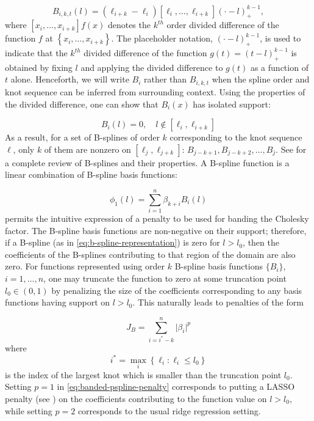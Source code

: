 \documentclass[12pt]{article}
\theoremstyle{definition}
\begin{document}
\begin{equation} \label{eq:bspline_definition}
B_{i,k,t}\left(l\right) = \left(\ell_{i+k}-\ell_i\right)\left[\ell_i,\dots,\ell_{i+k}\right]\left(\cdot -l \right)_+^{k-1},
\end{equation}  
\noindent
where $\left[ x_i,\dots,x_{i+k} \right] f\left(x\right)$ denotes the $k^{th}$ order divided difference of the function $f$ at $\left\{ x_i,\dots,x_{i+k} \right\}$. The placeholder notation, $\left(\cdot - l\right)_+^{k-1}$, is used to indicate that the $k^{th}$ divided difference of the function $g\left(t \right) = \left(t-l\right)^{k-1}_+$ is obtained by fixing $l$ and applying the divided difference to $g\left(t \right)$ as a function of $t$ alone. Henceforth, we will write $B_i$ rather than $B_{i,k,t}$ when the spline order and knot sequence can be inferred from surrounding context. Using the properties of the divided difference, one can show that  $B_i\left(x\right)$ has isolated support:

\[
B_i\left(l\right) = 0, \quad l \not \in \left[\ell_{i},\ell_{i+k}\right]
\]
\noindent
As a result, for a set of B-splines of order $k$ corresponding to the knot sequence $\ell$, only $k$ of them are nonzero on $\left[\ell_{j},\ell_{j+k}\right]$: $B_{j-k+1},B_{j-k+2},\dots,B_{j}$. See \citet{de1978practical} for a complete review of B-splines and their properties. A B-spline function is a linear combination of B-spline basis functions:

\begin{equation} \label{eq:b-spline-representation}
\phi_1\left(l\right) =  \sum_{i=1}^n \beta_{k+i} B_{i}\left(l\right)
\end{equation}
\noindent
permits the intuitive expression of a penalty to be used for banding the Cholesky factor. The B-spline basis functions are non-negative on their support; therefore, if a B-spline (as in \ref{eq:b-spline-representation}) is zero for $l > l_0$, then the coefficients of the B-splines contributing to that region of the domain are also zero. For functions represented using order $k$ B-spline basis functions $\lbrace B_i \rbrace$, $i=1,\dots,n$, one may truncate the function to zero at some truncation point $l_0 \in \left(0,1\right)$ by penalizing the size of the coefficients corresponding to any basis functions having support on $l > l_0$. This naturally leads to penalties of the form

\begin{equation} \label{eq:banded-pspline-penalty}
J_{B} = \sum_{ i=i^* -k }^n \vert \beta_i \vert^p
\end{equation}
\noindent
where
\[
i^* = \max\limits_{i} \left\{ \ell_i: \ell_i \le l_0 \right\}
\]
is the index of the largest knot which is smaller than the truncation point $l_0$. Setting $p=1$ in \ref{eq:banded-pspline-penalty} corresponds to putting a LASSO penalty (see \citet{tibshirani1996regression}) on the coefficients contributing to the function value on $l > l_0$, while setting $p=2$ corresponds to the usual ridge regression setting. 
\end{document}
